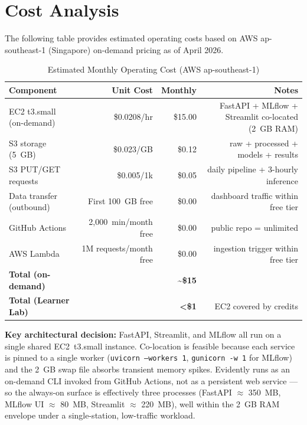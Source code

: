 \section{Cost Analysis}


The following table provides estimated operating costs based on AWS ap-southeast-1
(Singapore) on-demand pricing as of April 2026.

\begin{table}[H]
\centering
\caption{Estimated Monthly Operating Cost (AWS ap-southeast-1)}
\label{tab:cost}
\begin{tabular}{lrrr}
\toprule
\textbf{Component} & \textbf{Unit Cost} & \textbf{Monthly} & \textbf{Notes} \\
\midrule
EC2 t3.small (on-demand) & \$0.0208/hr & \$15.00 & FastAPI + MLflow + Streamlit co-located (2~GB RAM) \\
S3 storage (5~GB)        & \$0.023/GB  & \$0.12  & raw + processed + models + results \\
S3 PUT/GET requests      & \$0.005/1k  & \$0.05  & daily pipeline + 3-hourly inference \\
Data transfer (outbound) & First 100~GB free & \$0.00 & dashboard traffic within free tier \\
GitHub Actions           & 2,000~min/month free & \$0.00 & public repo = unlimited \\
AWS Lambda               & 1M requests/month free & \$0.00 & ingestion trigger within free tier \\
\midrule
\textbf{Total (on-demand)}  & & \textbf{\textasciitilde\$15} & \\
\textbf{Total (Learner Lab)} & & \textbf{\textless\$1} & EC2 covered by credits \\
\bottomrule
\end{tabular}
\end{table}

\textbf{Key architectural decision:} FastAPI, Streamlit, and MLflow all run on a
single shared EC2~t3.small instance. Co-location is feasible because each service
is pinned to a single worker (\texttt{uvicorn --workers 1}, \texttt{gunicorn -w 1}
for MLflow) and the 2~GB swap file absorbs transient memory spikes. Evidently runs
as an on-demand CLI invoked from GitHub Actions, not as a persistent web service ---
so the always-on surface is effectively three processes (FastAPI $\approx$ 350~MB,
MLflow UI $\approx$ 80~MB, Streamlit $\approx$ 220~MB), well within the
2~GB RAM envelope under a single-station, low-traffic workload.

